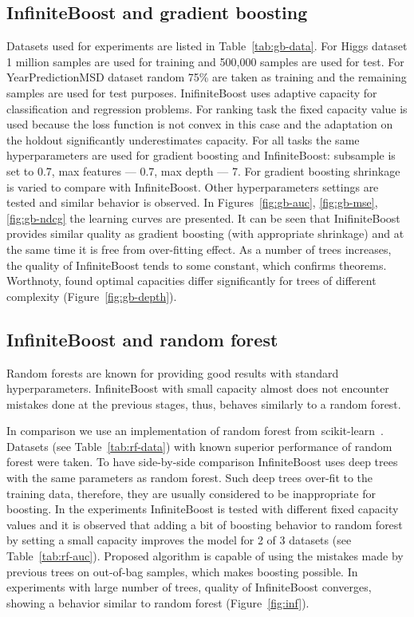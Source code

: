 \insertplotsgbarxiv
\insertplotsforestarxiv

\subsection{InfiniteBoost and gradient boosting}
Datasets used for experiments are listed in Table~\ref{tab:gb-data}. 
For Higgs dataset 1 million samples are used for training and 500,000 samples are used for test. 
For YearPredictionMSD dataset random 75\% are taken as training and the remaining samples are used for test purposes.
InifiniteBoost uses adaptive capacity for classification and regression problems.
For ranking task the fixed capacity value is used because the loss function is not convex in this case and the adaptation on the holdout significantly underestimates capacity.
For all tasks the same hyperparameters are used for gradient boosting and InfiniteBoost: subsample is set to 0.7, max features --- 0.7, max depth --- 7. 
For gradient boosting shrinkage is varied to compare with InfiniteBoost.
Other hyperparameters settings are tested and similar behavior is observed.
In Figures~\ref{fig:gb-auc}, \ref{fig:gb-mse}, \ref{fig:gb-ndcg} the learning curves are presented.
It can be seen that InifiniteBoost provides similar quality as gradient boosting (with appropriate shrinkage) and at the same time it is free from over-fitting effect. 
As a number of trees increases, the quality of InfiniteBoost tends to some constant, which confirms theorems.
Worthnoty, found optimal capacities differ significantly for trees of different complexity (Figure~\ref{fig:gb-depth}).

\insertplotsgbnips

\subsection{InfiniteBoost and random forest}

Random forests are known for providing good results with standard hyperparameters.
InfiniteBoost with small capacity almost does not encounter mistakes done at the previous stages,
thus, behaves similarly to a random forest.

In comparison we use an implementation of random forest from scikit-learn~\cite{key-sklearn}. 
Datasets (see Table~\ref{tab:rf-data}) with known superior performance of random forest were taken.
To have side-by-side comparison InfiniteBoost uses deep trees with the same parameters as random forest.
Such deep trees over-fit to the training data, therefore, they are usually considered to be inappropriate for boosting.
In the experiments InfiniteBoost is tested with different fixed capacity values and it is observed that adding a bit of boosting behavior to random forest by setting a small capacity improves the model for 2 of 3 datasets (see Table~\ref{tab:rf-auc}).
Proposed algorithm is capable of using the mistakes made by previous trees on out-of-bag samples, which makes boosting possible.
In experiments with large number of trees, quality of InfiniteBoost converges, showing a behavior similar to random forest (Figure~\ref{fig:inf}).

